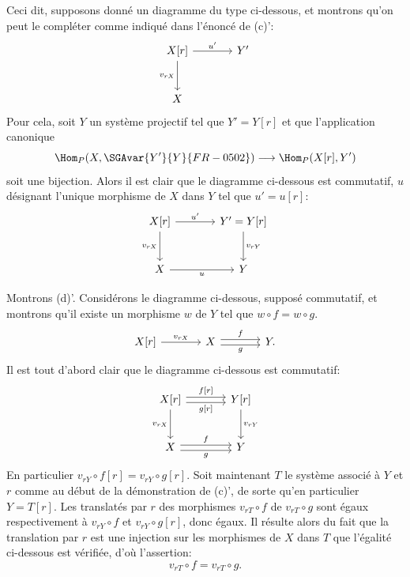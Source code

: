 Ceci dit, supposons donné un diagramme du type ci-dessous, et montrons qu'on peut le compléter comme indiqué dans l'énoncé de (c)':
\[
\begin{tikzcd}[column sep=large,row sep=large]
X[r] \arrow[r,"u'"] \arrow[d,"{v_{rX}}"'] & Y'\\
X
\end{tikzcd}
\]
Pour cela, soit $Y$ un système projectif tel que $Y'=Y[r]$ et que l'application canonique
\[
\Hom_P(X,\SGAvar{Y'}{Y}{FR-0502})\longrightarrow\Hom_P(X[r],Y')
\]
soit une bijection. Alors il est clair que le diagramme ci-dessous est commutatif, $u$ désignant l'unique morphisme de $X$ dans $Y$ tel que $u'=u[r]$:
\[
\begin{tikzcd}[column sep=large,row sep=large]
X[r] \arrow[r,"u'"] \arrow[d,"{v_{rX}}"'] & Y'=Y[r] \arrow[d,"{v_{rY}}"]\\
X \arrow[r,"u"'] & Y
\end{tikzcd}
\]

Montrons (d)'. Considérons le diagramme ci-dessous, supposé commutatif, et montrons qu'il existe un morphisme $w$ de $Y$ tel que $w\circ f=w\circ g$.
\[
\begin{tikzcd}[column sep=large]
X[r] \arrow[r,"{v_{rX}}"] & X \arrow[r,shift left,"f"] \arrow[r,shift right,"g"'] & Y .
\end{tikzcd}
\]
Il est tout d'abord clair que le diagramme ci-dessous est commutatif:
\[
\begin{tikzcd}[column sep=large,row sep=large]
X[r] \arrow[r,shift left,"{f[r]}"] \arrow[r,shift right,"{g[r]}"'] \arrow[d,"{v_{rX}}"'] & Y[r] \arrow[d,"{v_{rY}}"]\\
X \arrow[r,shift left,"f"] \arrow[r,shift right,"g"'] & Y
\end{tikzcd}
\]
En particulier $v_{rY}\circ f[r]=v_{rY}\circ g[r]$. Soit maintenant $T$ le système associé à $Y$ et $r$ comme au début de la démonstration de (c)', de sorte qu'en
particulier $Y=T[r]$. Les translatés par $r$ des morphismes $v_{rT}\circ f$ de $v_{rT}\circ g$ sont égaux respectivement à $v_{rY}\circ f$ et $v_{rY}\circ g[r]$, donc égaux. Il résulte alors du fait que la translation par $r$ est une injection sur les morphismes de $X$ dans $T$ que l'égalité ci-dessous est vérifiée, d'où l'assertion:
\[
v_{rT}\circ f=v_{rT}\circ g.
\]

